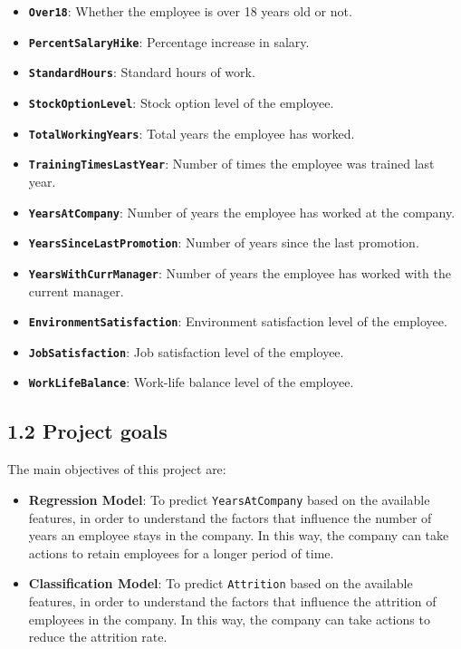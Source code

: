 \documentclass[
]{article}
\begin{document}
\begin{itemize}
\begin{itemize}
  \item
    \textbf{\texttt{Over18}}: Whether the employee is over 18 years old
    or not.
  \item
    \textbf{\texttt{PercentSalaryHike}}: Percentage increase in salary.
  \item
    \textbf{\texttt{StandardHours}}: Standard hours of work.
  \item
    \textbf{\texttt{StockOptionLevel}}: Stock option level of the
    employee.
  \item
    \textbf{\texttt{TotalWorkingYears}}: Total years the employee has
    worked.
  \item
    \textbf{\texttt{TrainingTimesLastYear}}: Number of times the
    employee was trained last year.
  \item
    \textbf{\texttt{YearsAtCompany}}: Number of years the employee has
    worked at the company.
  \item
    \textbf{\texttt{YearsSinceLastPromotion}}: Number of years since the
    last promotion.
  \item
    \textbf{\texttt{YearsWithCurrManager}}: Number of years the employee
    has worked with the current manager.
  \item
    \textbf{\texttt{EnvironmentSatisfaction}}: Environment satisfaction
    level of the employee.
  \item
    \textbf{\texttt{JobSatisfaction}}: Job satisfaction level of the
    employee.
  \item
    \textbf{\texttt{WorkLifeBalance}}: Work-life balance level of the
    employee.
  \end{itemize}
\end{itemize}

\hypertarget{project-goals}{%
\subsection{1.2 Project goals}\label{project-goals}}

The main objectives of this project are:

\begin{itemize}
\item
  \textbf{Regression Model}: To predict \texttt{YearsAtCompany} based on
  the available features, in order to understand the factors that
  influence the number of years an employee stays in the company. In
  this way, the company can take actions to retain employees for a
  longer period of time.
\item
  \textbf{Classification Model}: To predict \texttt{Attrition} based on
  the available features, in order to understand the factors that
  influence the attrition of employees in the company. In this way, the
  company can take actions to reduce the attrition rate.
\end{itemize}
\end{document}
